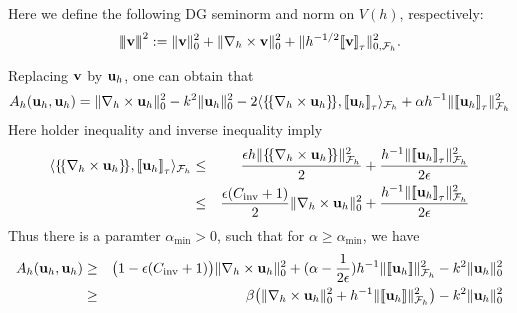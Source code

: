 \documentclass[final,leqno]{siamltex704}
\newcommand{\bn}{{\bf n}}
\newcommand{\bv}{{\bf v}}
\def\bn{{\bf n}}
\def\bu{{\bf u}}
\def\bv{{\bf v}}
\def\ljump{{[\![}}
\def\rjump{{]\!]}}
\def\lavg{{\{\!\{}}
\def\ravg{{\}\!\}}}
\def\3bar{{|\hspace{-.02in}|\hspace{-.02in}|}}
\begin{document}
Here we define the following DG seminorm and norm on $V(h)$, respectively:
\begin{eqnarray}
\3bar\bv\3bar^2:=\|\bv\|_0^2+\|\nabla_h\times\bv\|_0^2+\|h^{-1/2}\ljump\bv\rjump_{\tau}\|_{0,\mathcal{F}_h}^2.
\end{eqnarray}

Replacing $\bv$ by $\bu_h$, one can obtain that
\begin{eqnarray*}
A_h(\bu_h,\bu_h)=\|\nabla_h\times\bu_h\|_0^2-k^2\|\bu_h\|_0^2-2\langle\lavg\nabla_h\times\bu_h\ravg,\ljump\bu_h\rjump_{\tau}\rangle_{\mathcal{F}_h}+\alpha h^{-1}\|\ljump\bu_h\rjump_{\tau}\|_{\mathcal{F}_h}^2
\end{eqnarray*}
Here holder inequality and inverse inequality imply
\begin{eqnarray*}
\langle\lavg\nabla_h\times\bu_h\ravg,\ljump\bu_h\rjump_{\tau}\rangle_{\mathcal{F}_h}&\le& 
\frac{\epsilon h\|\lavg\nabla_h\times\bu_h\ravg\|_{\mathcal{F}_h}^2}{2}
+\frac{h^{-1}\|\ljump\bu_h\rjump_{\tau}\|_{\mathcal{F}_h}^2}{2\epsilon}\\
&\le& \frac{\epsilon(C_{\text{inv}}+1)}{2}\|\nabla_h\times\bu_h\|^2_0+\frac{h^{-1}\|\ljump\bu_h\rjump_{\tau}\|_{\mathcal{F}_h}^2}{2\epsilon}
\end{eqnarray*}
Thus there is a paramter $\alpha_{\min}>0$, such that for $\alpha\ge\alpha_{\min}$, we have
\begin{eqnarray*}
A_h(\bu_h,\bu_h)&\ge& \big(1-\epsilon(C_{\text{inv}}+1)\big)\|\nabla_h\times\bu_h\|_0^2+(\alpha-\frac{1}{2\epsilon})h^{-1}\|\ljump\bu_h\rjump\|_{\mathcal{F}_h}^2-k^2\|\bu_h\|_0^2\\
&\ge&\beta\big(\|\nabla_h\times\bu_h\|_0^2+h^{-1}\|\ljump\bu_h\rjump\|_{\mathcal{F}_h}^2\big)-k^2\|\bu_h\|_0^2
\end{eqnarray*}


\end{document}
